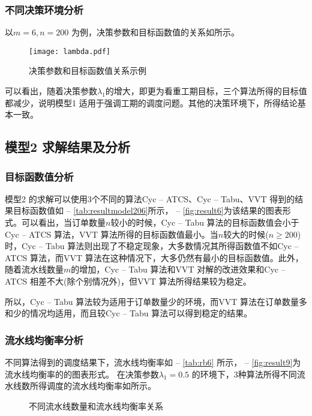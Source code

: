 \subsubsection{不同决策环境分析}
以$m = 6, n = 200$ 为例，决策参数和目标函数值的关系如所示。
\begin{figure}
\centering
\texttt{[image: lambda.pdf]}
\caption{决策参数和目标函数值关系示例}\label{fig:decisionvsG}
\end{figure}
可以看出，随着决策参数$\lambda_1$的增大，即更为看重工期目标，三个算法所得的目标值都减少，说明模型1 适用于强调工期的调度问题。其他的决策环境下，所得结论基本一致。
\subsection{模型2 求解结果及分析}
\subsubsection{目标函数值分析}
模型2 的求解可以使用3个不同的算法Cyc -- ATCS、Cyc -- Tabu、VVT 得到的结果目标函数值如 -- \ref{tab:resultmodel206}所示， -- \ref{fig:result6}为该结果的图表形式。可以看出，当订单数量$n$较小的时候，Cyc -- Tabu 算法的目标函数值会小于Cyc -- ATCS 算法，VVT 算法所得的目标函数值最小。当$n$较大的时候($n \ge 200$)时，Cyc -- Tabu 算法则出现了不稳定现象，大多数情况其所得函数值不如Cyc -- ATCS 算法，而VVT 算法在这种情况下，大多仍然有最小的目标函数值。此外，随着流水线数量$m$的增加，Cyc -- Tabu 算法和VVT 对解的改进效果和Cyc -- ATCS 相差不大(除个别情况外)，但VVT 算法所得结果较为稳定。

所以，Cyc -- Tabu 算法较为适用于订单数量少的环境，而VVT 算法在订单数量多和少的情况均适用，而且较Cyc -- Tabu 算法可以得到稳定的结果。

\subsubsection{流水线均衡率分析}
不同算法得到的调度结果下，流水线均衡率如 -- \ref{tab:rb6} 所示， -- \ref{fig:result9}为流水线均衡率的的图表形式。
在决策参数$\lambda_1 = 0.5$ 的环境下，$3$种算法所得不同流水线数所得调度的流水线均衡率如所示。
\begin{figure}[h]
\centering
{}
\caption{不同流水线数量和流水线均衡率关系}\label{fig:linenumbervsrate}
\end{figure}

